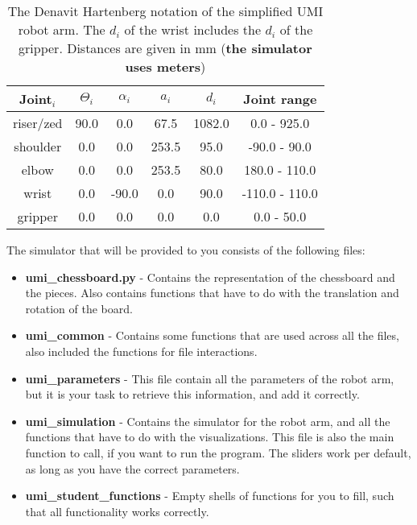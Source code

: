 \documentclass[10pt]{scrartcl}
\begin{document}
\begin{table}[h!]
    \centering
    \begin{tabular}{|c|c|c|c|c|c|} \hline
        Joint$_i$ & $\Theta_i$ & $\alpha_i$ & $a_i$ & $d_i$ & Joint range \\ \hline
        riser/zed & 90.0 & 0.0 & 67.5 & 1082.0 & 0.0 - 925.0 \\ \hline
        shoulder & 0.0 & 0.0 & 253.5 & 95.0 & -90.0 - 90.0 \\ \hline
        elbow & 0.0 & 0.0 & 253.5 & 80.0 & 180.0 - 110.0 \\ \hline
        wrist & 0.0 & -90.0 & 0.0 & 90.0 & -110.0 - 110.0 \\ \hline
        gripper & 0.0 & 0.0 & 0.0 & 0.0 & 0.0 - 50.0 \\ \hline
    \end{tabular}
    \caption{The Denavit Hartenberg notation of the simplified UMI robot arm. The $d_i$ of the wrist includes the $d_i$ of the gripper. Distances are given in mm (\textbf{the simulator uses meters})}
    \label{tab:denavit}
\end{table}

The simulator that will be provided to you consists of the following files:
\begin{itemize}
    \item \textbf{umi\_chessboard.py} - Contains the representation of the chessboard and the pieces. Also contains functions that have to do with the translation and rotation of the board.
    \item \textbf{umi\_common} - Contains some functions that are used across all the files, also included the functions for file interactions.
    \item \textbf{umi\_parameters} - This file contain all the parameters of the robot arm, but it is your task to retrieve this information, and add it correctly.
    \item \textbf{umi\_simulation} - Contains the simulator for the robot arm, and all the functions that have to do with the visualizations. This file is also the main function to call, if you want to run the program. The sliders work per default, as long as you have the correct parameters.
    \item \textbf{umi\_student\_functions} - Empty shells of functions for you to fill, such that all functionality works correctly.
\end{itemize}
\end{document}
